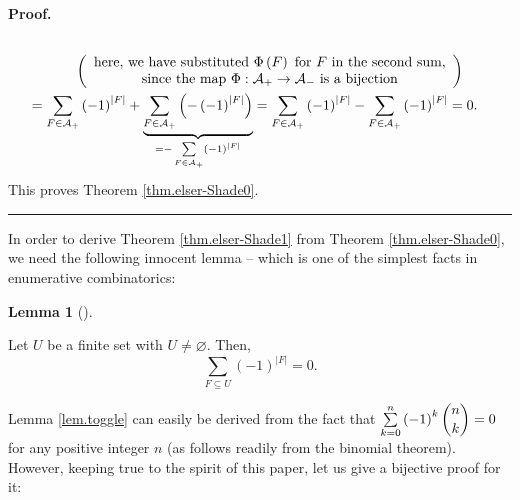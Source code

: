 \documentclass[numbers=enddot,12pt,final,onecolumn]{scrartcl}%
\theoremstyle{definition}
\newtheorem{lem}[theo]{Lemma}
\newenvironment{lemma}[1][]
{\begin{lem}[#1]\begin{leftbar}}
{\end{leftbar}\end{lem}}
\newenvironment{proof}[1][Proof]{\noindent\textbf{#1.} }{\ \rule{0.5em}{0.5em}}
\let\sumnonlimits\sum
\renewcommand{\sum}{\sumnonlimits\limits}
\newenvironment{verlong}{}{}
\begin{document}
\begin{verlong}
\begin{proof}
\begin{align*}
{{}}\\
&  \ \ \ \ \ \ \ \ \ \ \left(
\begin{array}
[c]{c}%
\text{here, we have substituted }\Phi\left(  F\right)  \text{ for }F\text{ in
the second sum,}\\
\text{since the map }\Phi:\mathcal{A}_{+}\rightarrow\mathcal{A}_{-}\text{ is a
bijection}%
\end{array}
\right) \\
&  =\sum_{F\in\mathcal{A}_{+}}\left(  -1\right)  ^{\left\vert F\right\vert
}+\underbrace{\sum_{F\in\mathcal{A}_{+}}\left(  -\left(  -1\right)
^{\left\vert F\right\vert }\right)  }_{=-\sum_{F\in\mathcal{A}_{+}}\left(
-1\right)  ^{\left\vert F\right\vert }}=\sum_{F\in\mathcal{A}_{+}}\left(
-1\right)  ^{\left\vert F\right\vert }-\sum_{F\in\mathcal{A}_{+}}\left(
-1\right)  ^{\left\vert F\right\vert }=0.
\end{align*}
This proves Theorem \ref{thm.elser-Shade0}.
\end{proof}
\end{verlong}

In order to derive Theorem \ref{thm.elser-Shade1} from Theorem
\ref{thm.elser-Shade0}, we need the following innocent lemma -- which is one
of the simplest facts in enumerative combinatorics:

\begin{lemma}
\label{lem.toggle}Let $U$ be a finite set with $U\neq\varnothing$. Then,%
\[
\sum_{F\subseteq U}\left(  -1\right)  ^{\left\vert F\right\vert }=0.
\]

\end{lemma}

Lemma \ref{lem.toggle} can easily be derived from the fact that $\sum
_{k=0}^{n}\left(  -1\right)  ^{k}\dbinom{n}{k}=0$ for any positive integer $n$
(as follows readily from the binomial theorem). However, keeping true to the
spirit of this paper, let us give a bijective proof for it:
\end{document}
